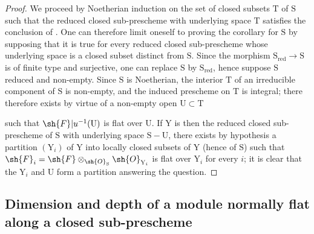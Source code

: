 \begin{proof}
We proceed by Noetherian induction  on the set of closed subsets $\mathrm{T}$ of $\mathrm{S}$ such that the reduced closed sub-prescheme with underlying space $\mathrm{T}$ satisfies the conclusion of . One can therefore limit oneself to proving the corollary for $\mathrm{S}$ by supposing that it is true for every reduced closed sub-prescheme whose underlying space is a closed subset distinct from $\mathrm{S}$. Since the morphism $\mathrm{S}_\mathrm{red}\to\mathrm{S}$ is of finite type and surjective, one can replace $\mathrm{S}$ by $\mathrm{S}_\mathrm{red}$, hence suppose $\mathrm{S}$ reduced and non-empty. Since $\mathrm{S}$ is Noetherian, the interior $\mathrm{T}$ of an irreducible component of $\mathrm{S}$ is non-empty, and the induced prescheme on $\mathrm{T}$ is integral; there therefore exists by virtue of  a non-empty open $\mathrm{U}\subset\mathrm{T}$


such that $\sh{F}|u^{-1}(\mathrm{U})$ is flat over $\mathrm{U}$. If $\mathrm{Y}$ is then the reduced closed sub-prescheme of $\mathrm{S}$ with underlying space $\mathrm{S}-\mathrm{U}$, there exists by hypothesis a partition $(\mathrm{Y}_i)$ of $\mathrm{Y}$ into locally closed subsets of $\mathrm{Y}$ (hence of $\mathrm{S}$) such that $\sh{F}_i=\sh{F}\otimes_{\sh{O}_\mathrm{S}}\sh{O}_{\mathrm{Y}_i}$ is flat over $\mathrm{Y}_i$ for every $i$; it is clear that the $\mathrm{Y}_i$ and $\mathrm{U}$ form a partition answering the question.
\end{proof}

\subsection{Dimension and depth of a module normally flat along a closed sub-prescheme}
\label{subsection:IV.6.10}

